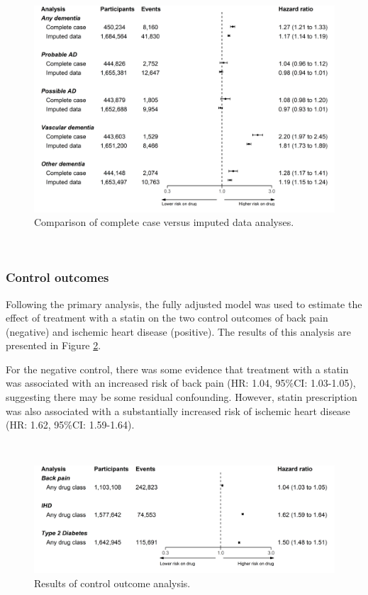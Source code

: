\documentclass[a4paper, twoside]{templates/ociamthesis}
\begin{document}
\begin{figure}[H]
\includegraphics[width=1\linewidth]{figures/cprd-analysis/forester_complete_case} \caption[Complete case vs.~imputed data analysis]{Comparison of complete case versus imputed data analyses.}\label{fig:completeCaseFig}
\end{figure}

~

\hypertarget{control-outcomes-1}{%
\subsubsection{Control outcomes}\label{control-outcomes-1}}

Following the primary analysis, the fully adjusted model was used to estimate the effect of treatment with a statin on the two control outcomes of back pain (negative) and ischemic heart disease (positive). The results of this analysis are presented in Figure \ref{fig:controlOutcomeFig}.

For the negative control, there was some evidence that treatment with a statin was associated with an increased risk of back pain (HR: 1.04, 95\%CI: 1.03-1.05), suggesting there may be some residual confounding. However, statin prescription was also associated with a substantially increased risk of ischemic heart disease (HR: 1.62, 95\%CI: 1.59-1.64).

~





\begin{figure}[H]
\includegraphics[width=1\linewidth]{figures/cprd-analysis/forester_control_outcomes} \caption[Results of control outcome analysis]{Results of control outcome analysis.}\label{fig:controlOutcomeFig}
\end{figure}
\end{document}
